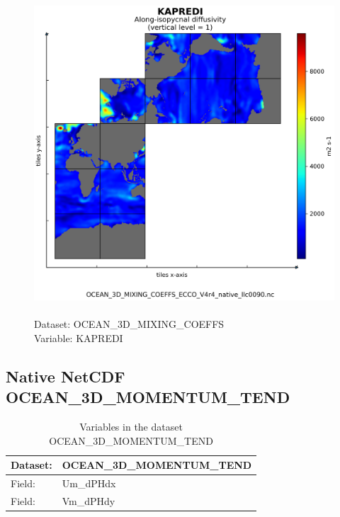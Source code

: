 \begin{figure}[H]
\centering
\includegraphics[scale=0.5]{../images/plots/native_plots/Ocean_3D_Gent-Mcwilliams_Redi_and_Background_Vertical_Diffusivity_Coefficients_for_the_Lat-Lon-Cap_90_(llc90)_Native_Model_Grid_(Version_4_Release_4)/KAPREDI.png}
\caption{\\Dataset: OCEAN\_3D\_MIXING\_COEFFS\\Variable: KAPREDI}
\label{tab:table-OCEAN_3D_MIXING_COEFFS_KAPREDI-Plot}
\end{figure}
\pagebreak
\subsection{Native NetCDF OCEAN\_3D\_MOMENTUM\_TEND}
\newp
\begin{longtable}{|p{}|p{}|}
\caption{Variables in the dataset OCEAN\_3D\_MOMENTUM\_TEND}
\label{tab:table-OCEAN_3D_MOMENTUM_TEND-fields} \\ 
\hline \endhead \hline \endfoot
\rowcolor{lightgray} \textbf{Dataset:} & \textbf{OCEAN\_3D\_MOMENTUM\_TEND} \\ \hline
Field: &Um\_dPHdx \\ \hline
Field: &Vm\_dPHdy \\ \hline
\end{longtable}

